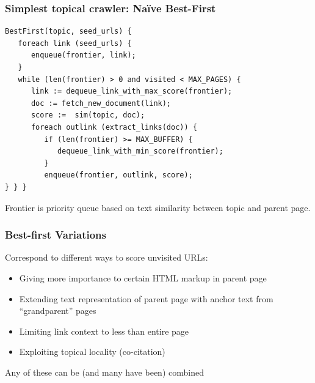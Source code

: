 \documentclass{beamer}
\begin{document}
\begin{frame}[fragile] \frametitle{ Simplest topical crawler: Na\"ive
    Best-First }
{\small
\begin{verbatim}
BestFirst(topic, seed_urls) {
   foreach link (seed_urls) {
      enqueue(frontier, link);
   }
   while (len(frontier) > 0 and visited < MAX_PAGES) {
      link := dequeue_link_with_max_score(frontier);
      doc := fetch_new_document(link);
      score :=  sim(topic, doc);
      foreach outlink (extract_links(doc)) {
         if (len(frontier) >= MAX_BUFFER) {
            dequeue_link_with_min_score(frontier);
         }
         enqueue(frontier, outlink, score);
} } }
\end{verbatim}
}

\begin{block}{}
Frontier is priority queue based on text similarity between topic and
parent page.
\end{block}

\end{frame}


\begin{frame} \frametitle{Best-first Variations}
 
Correspond to different ways to score unvisited URLs: 

\begin{itemize}
\item Giving more importance to certain HTML markup in parent page
\item Extending text representation of parent page with anchor text from ``grandparent'' pages 
\item Limiting link context to less than entire page
\item Exploiting topical locality (co-citation)
\end{itemize}

\begin{block}{}
Any of these can be (and many have been) combined
\end{block}

\end{frame}



 

\end{document}
